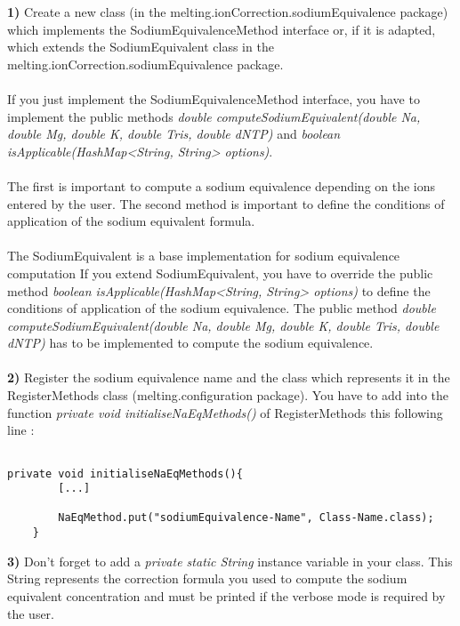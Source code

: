 \documentclass{article}
\begin{document}
\textbf{1)} Create a new class (in the melting.ionCorrection.sodiumEquivalence package) which implements 
the SodiumEquivalenceMethod interface or, if it is adapted, which extends the SodiumEquivalent 
class in the melting.ionCorrection.sodiumEquivalence package. \\
\\
If you just implement the SodiumEquivalenceMethod interface, you have to implement the public methods 
\textit{double computeSodiumEquivalent(double Na, double Mg, double K, double Tris, double dNTP)} and 
\textit{boolean isApplicable(HashMap<String, String> options)}. \\
\\
The first is important to compute a sodium equivalence depending on the ions entered by the user. 
The second method is important to define the conditions of application of the sodium equivalent formula.\\
\\

The SodiumEquivalent is a base implementation for sodium equivalence computation
If you extend SodiumEquivalent, you have to override the public method \textit{boolean isApplicable(HashMap<String, String> options)} 
to define the conditions of application of the sodium equivalence.
The public method \textit{double computeSodiumEquivalent(double Na, double Mg, double K, double Tris, double dNTP)} 
has to be implemented to compute the sodium equivalence.\\
\\


\textbf{2)} Register the sodium equivalence name and the class which represents it in the RegisterMethods
class (melting.configuration package). 
You have to add into the function \textit{private void initialiseNaEqMethods()} of RegisterMethods
this following line :

\begin{verbatim}

private void initialiseNaEqMethods(){
		[...]
		
		NaEqMethod.put("sodiumEquivalence-Name", Class-Name.class);
	}

\end{verbatim} 


\textbf{3)} Don't forget to add a \textit{private static String} instance variable in your class. This
String represents the correction formula you used to compute the sodium equivalent concentration
and must be printed if the verbose mode is required by the user.
\end{document}
